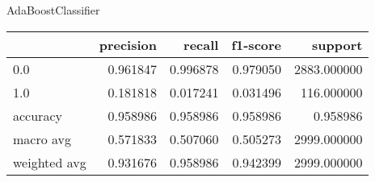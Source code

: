 AdaBoostClassifier
\begin{tabular}{lrrrr}
\toprule
{} &  precision &    recall &  f1-score &      support \\
\midrule
0.0          &   0.961847 &  0.996878 &  0.979050 &  2883.000000 \\
1.0          &   0.181818 &  0.017241 &  0.031496 &   116.000000 \\
accuracy     &   0.958986 &  0.958986 &  0.958986 &     0.958986 \\
macro avg    &   0.571833 &  0.507060 &  0.505273 &  2999.000000 \\
weighted avg &   0.931676 &  0.958986 &  0.942399 &  2999.000000 \\
\bottomrule
\end{tabular}
